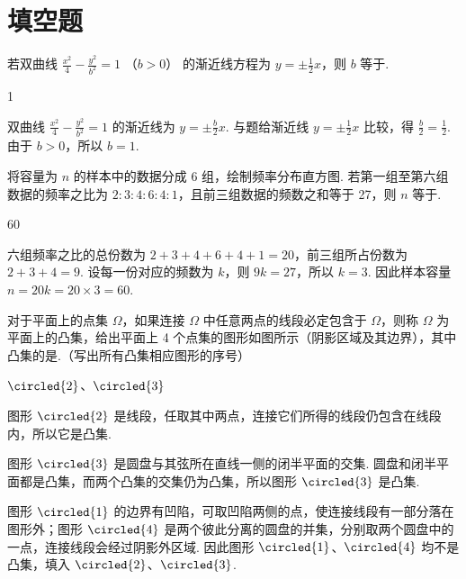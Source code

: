 \section{填空题}

\begin{problem}
若双曲线 \(\frac{x^2}{4} - \frac{y^2}{b^2} = 1\) （\(b > 0\)） 的渐近线方程为 \(y = \pm \frac{1}{2}x\)，则 \(b\) 等于\fillinblank{}.
\end{problem}

\begin{answer}
1
\end{answer}

\begin{solution}
双曲线 \(\frac{x^2}{4}-\frac{y^2}{b^2}=1\) 的渐近线为
\(y=\pm\frac{b}{2}x\). 与题给渐近线 \(y=\pm\frac12x\) 比较，得 \(\frac{b}{2}=\frac12\). 由于 \(b>0\)，所以 \(b=1\).
\end{solution}

\begin{problem}
将容量为 \(n\) 的样本中的数据分成 6 组，绘制频率分布直方图. 若第一组至第六组数据的频率之比为 \(2:3:4:6:4:1\)，且前三组数据的频数之和等于 27，则 \(n\) 等于\fillinblank{}.
\end{problem}

\begin{answer}
60
\end{answer}

\begin{solution}
六组频率之比的总份数为 \(2+3+4+6+4+1=20\)，前三组所占份数为 \(2+3+4=9\). 设每一份对应的频数为 \(k\)，则 \(9k=27\)，所以 \(k=3\). 因此样本容量
\(n=20k=20\times3=60\).
\end{solution}

\begin{problem}
对于平面上的点集 \(\Omega\)，如果连接 \(\Omega\) 中任意两点的线段必定包含于 \(\Omega\)，则称 \(\Omega\) 为平面上的凸集，给出平面上 4 个点集的图形如图所示（阴影区域及其边界），其中凸集的是\fillinblank{}.（写出所有凸集相应图形的序号）

\end{problem}

\begin{answer}
\(\circled{2}\)、\(\circled{3}\)
\end{answer}

\begin{solution}
图形 \(\circled{2}\) 是线段，任取其中两点，连接它们所得的线段仍包含在线段内，所以它是凸集.

图形 \(\circled{3}\) 是圆盘与其弦所在直线一侧的闭半平面的交集. 圆盘和闭半平面都是凸集，而两个凸集的交集仍为凸集，所以图形 \(\circled{3}\) 是凸集.

图形 \(\circled{1}\) 的边界有凹陷，可取凹陷两侧的点，使连接线段有一部分落在图形外；图形 \(\circled{4}\) 是两个彼此分离的圆盘的并集，分别取两个圆盘中的一点，连接线段会经过阴影外区域. 因此图形 \(\circled{1}\)、\(\circled{4}\) 均不是凸集，填入 \(\circled{2}\)、\(\circled{3}\).
\end{solution}

